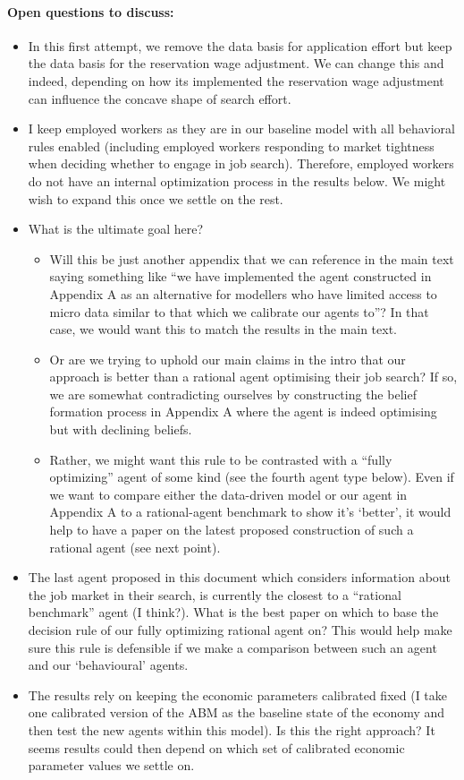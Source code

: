 \documentclass[11pt]{article}
\begin{document}
\paragraph{Open questions to discuss:}
\begin{itemize}
    \item In this first attempt, we remove the data basis for application effort but keep the data basis for the reservation wage adjustment. We can change this and indeed, depending on how its implemented the reservation wage adjustment can influence the concave shape of search effort.
    \item I keep employed workers as they are in our baseline model with all behavioral rules enabled (including employed workers responding to market tightness when deciding whether to engage in job search). Therefore, employed workers do not have an internal optimization process in the results below. We might wish to expand this once we settle on the rest. 
    \item What is the ultimate goal here?
    \begin{itemize}
        \item Will this be just another appendix that we can reference in the main text saying something like ``we have implemented the agent constructed in Appendix A as an alternative for modellers who have limited access to micro data similar to that which we calibrate our agents to''? In that case, we would want this to match the results in the main text. 
        \item Or are we trying to uphold our main claims in the intro that our approach is better than a rational agent optimising their job search? If so, we are somewhat contradicting ourselves by constructing the belief formation process in Appendix A where the agent is indeed optimising but with declining beliefs.
        \item Rather, we might want this rule to be contrasted with a ``fully optimizing'' agent of some kind (see the fourth agent type below). Even if we want to compare either the data-driven model or our agent in Appendix A to a rational-agent benchmark to show it’s `better', it would help to have a paper on the latest proposed construction of such a rational agent (see next point). 
    \end{itemize}
    \item The last agent proposed in this document which considers information about the job market in their search, is currently the closest to a ``rational benchmark'' agent (I think?). What is the best paper on which to base the decision rule of our fully optimizing rational agent on? This would help make sure this rule is defensible if we make a comparison between such an agent and our `behavioural' agents.
    \item The results rely on keeping the economic parameters calibrated fixed (I take one calibrated version of the ABM as the baseline state of the economy and then test the new agents within this model). Is this the right approach? It seems results could then depend on which set of calibrated economic parameter values we settle on.
\end{itemize}
\end{document}
